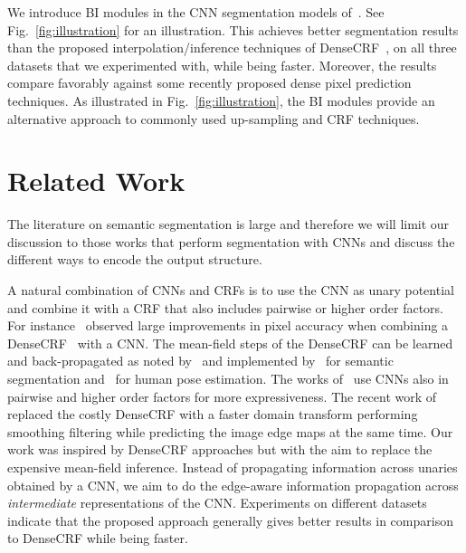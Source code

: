 We introduce BI modules in the CNN segmentation models
of~\cite{chen2014semantic,zheng2015conditional,bell2015minc}.
See Fig.~\ref{fig:illustration} for an illustration. This
achieves better segmentation results than the proposed
interpolation/inference techniques of DenseCRF~\cite{bell2015minc,chen2014semantic},
on all three datasets that we experimented with,
while being faster. Moreover, the results compare favorably against some recently
proposed dense pixel prediction techniques.
As illustrated in Fig.~\ref{fig:illustration}, the BI modules
provide an alternative approach to commonly used up-sampling and CRF
techniques.


\vspace{-0.3cm}
\section{Related Work}\label{sec:related}

The literature on semantic segmentation is large and therefore we
will limit our discussion to those works that perform segmentation with
CNNs and discuss the different ways to encode the output structure.

A natural combination of CNNs and CRFs is to use the CNN as unary potential
and combine it with a CRF that also includes pairwise or higher order factors.
For instance~\cite{chen2014semantic,bell2015minc}
observed large improvements in pixel accuracy when combining a DenseCRF~\cite{krahenbuhl2012efficient}
with a CNN. The mean-field steps of the DenseCRF can
be learned and back-propagated as noted by~\cite{domke2013learning} and implemented
by~\cite{zheng2015conditional,arxivpaper,li2014mean,schwing2015fully} for semantic segmentation and~\cite{kiefel2014human} for human pose estimation.
The works of~\cite{chen2014learning,lin2015efficient,liu2015semantic}
use CNNs also in pairwise and higher order factors for more expressiveness.
The recent work of~\cite{chen2015semantic} replaced the costly
DenseCRF with a faster domain transform performing smoothing filtering while
predicting the image edge maps at the same time.
Our work was inspired by DenseCRF approaches but with the aim to replace the
expensive mean-field inference. Instead of propagating information across unaries
obtained by a CNN, we aim to do the edge-aware information propagation across
\textit{intermediate} representations of the CNN. Experiments on different datasets indicate that
the proposed approach generally gives better results in comparison to DenseCRF
while being faster.


